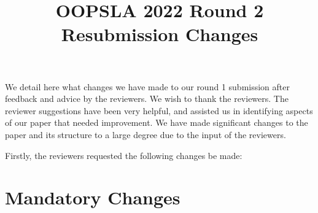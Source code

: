 \documentclass[11pt]{amsart}
\title{OOPSLA 2022 Round 2 Resubmission Changes}
\begin{document}
\maketitle
 We detail here what changes we have made to our 
 round 1 submission after feedback and advice by 
 the reviewers. We wish to thank the reviewers.
 The reviewer suggestions have been very helpful,
 and assisted us in identifying aspects of our paper
 that needed improvement. We have made significant changes
 to the paper and its structure to a large degree
 due to the input of the reviewers.

 Firstly, the reviewers requested 
 the following changes be made:
 
 \section{Mandatory Changes}
\end{document}
